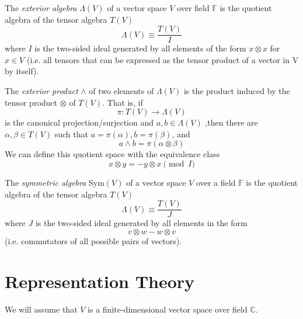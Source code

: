 \documentclass{article}
\begin{document}
  \begin{definition}
    The \textit{exterior algebra} $\Lambda(V)$ of a vector space $V$ over field $\mathbb{F}$ is the quotient algebra of the tensor algebra $T(V)$
    \begin{equation}
      \Lambda(V) \equiv \frac{T(V)}{I}
    \end{equation}
    where $I$ is the two-sided ideal generated by all elements of the form $x \otimes x$ for $x \in V$ (i.e. all tensors that can be expressed as the tensor product of a vector in V by itself). 

    The \textit{exterior product} $\wedge$ of two elements of $\Lambda(V)$ is the product induced by the tensor product $\otimes$ of $T(V)$. That is, if 
    \begin{equation}
      \pi: T(V) \longrightarrow \Lambda(V)
    \end{equation}
    is the canonical projection/surjection and $a, b \in \Lambda(V)$ ,then there are $\alpha, \beta \in T(V)$ such that $a = \pi(\alpha), b = \pi(\beta)$, and 
    \begin{equation}
      a \wedge b = \pi(\alpha \otimes \beta)
    \end{equation}
    We can define this quotient space with the equivalence class
    \begin{equation}
      x \otimes y = - y \otimes x \pmod{I}
    \end{equation}
  \end{definition}

  \begin{definition}
    The \textit{symmetric algebra} Sym$(V)$ of a vector space $V$ over a field $\mathbb{F}$ is the quotient algebra of the tensor algebra $T(V)$ 
    \begin{equation}
      \Lambda(V) \equiv \frac{T(V)}{J}
    \end{equation}
    where $J$ is the two-sided ideal generated by all elements in the form 
    \begin{equation}
      v \otimes w - w \otimes v
    \end{equation}
    (i.e. commutators of all possible pairs of vectors). 
  \end{definition}

\section{Representation Theory}

  We will assume that $V$ is a finite-dimensional vector space over field $\mathbb{C}$. 
\end{document}
